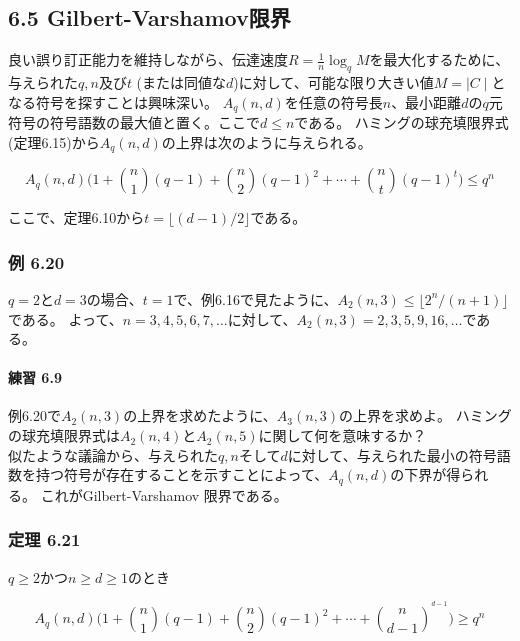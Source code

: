 \documentclass[12pt,a4paper]{article}
\begin{document}
  \subsection*{6.5 Gilbert-Varshamov限界}
    
    良い誤り訂正能力を維持しながら、伝達速度$R = \frac{1}{n} \log_q M$を最大化するために、与えられた$q, n$及び$t $ (または同値な$d$)に対して、可能な限り大きい値$M = \mid C \mid $となる符号を探すことは興味深い。
    $A_q (n, d)$を任意の符号長$n$、最小距離$d$の$q$元符号の符号語数の最大値と置く。ここで$d \leq n$である。
    ハミングの球充填限界式 (定理6.15)から$A_q (n, d)$の上界は次のように与えられる。

    \[A_q (n, d) \big(1 + \binom n1 (q - 1) + \binom n2 {(q - 1)}^2 + \cdots + \binom nt {(q - 1)}^t \big) \leq q^n\]

    ここで、定理6.10から$t = \lfloor (d - 1) / 2 \rfloor$である。

    \subsubsection*{例 6.20}
      
    $q = 2$と$d = 3$の場合、$t = 1$で、例6.16で見たように、$A_2 (n, 3) \leq \lfloor 2^n / (n + 1) \rfloor$である。
    よって、$n = 3, 4, 5, 6, 7, \dots $に対して、$A_2 (n, 3) = 2, 3, 5, 9, 16, \dots $である。

      \paragraph{練習 6.9}
        
      例6.20で$A_2 (n, 3)$の上界を求めたように、$A_3(n, 3)$の上界を求めよ。
      ハミングの球充填限界式は$A_2 (n, 4)$と$A_2 (n,5)$に関して何を意味するか？ \\

    似たような議論から、与えられた$q, n$そして$d$に対して、与えられた最小の符号語数を持つ符号が存在することを示すことによって、$A_q(n, d)$の下界が得られる。
    これがGilbert-Varshamov 限界である。

    \subsubsection*{定理 6.21}
      $q \geq 2$かつ$n \geq d \geq 1$のとき

      \[A_q (n, d) \big( 1 + \binom n1 (q - 1) + \binom n2 {(q- 1)}^2 + \cdots + \binom{n}{d - 1}^{^{d -1} } \big) \geq q^n \]
\end{document}
